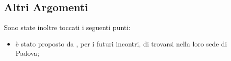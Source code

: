 \documentclass[a4paper,titlepage]{article}
\begin{document}
\subsection{Altri Argomenti}
\label{sub:AltriArgomenti}

Sono state inoltre toccati i seguenti punti:

\begin{itemize}
  \item è stato proposto da \PROPONENTE, per i futuri incontri, di trovarsi nella loro sede di Padova;
\end{itemize}
\end{document}
